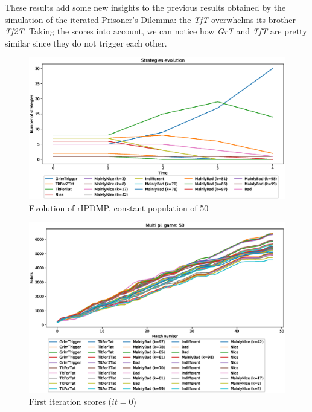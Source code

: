 \documentclass[journal,10pt,twoside]{IEEEtran}
\begin{document}
These results add some new insights to the previous results obtained by the simulation of the iterated Prisoner's Dilemma: the \textit{TfT} overwhelms its brother \textit{Tf2T}. Taking the scores into account, we can notice how \textit{GrT} and \textit{TfT} are pretty similar since they do not trigger each other.

\begin{figure}[!ht]
    \centering
    \includegraphics[width=1\columnwidth]{../img/ripdmp-const/ripdmp-evolution-const-pop-50}
    \caption{Evolution of rIPDMP, constant population of 50}
    \label{fig:constR}
\end{figure}

\begin{figure}[!ht]
    \centering
    \includegraphics[width=1\columnwidth]{../img/ripdmp-const/ripdmp-scores-const-pop-50-r0}
    \caption{First iteration scores ($it=0$)}
    \label{fig:constFI}
\end{figure}
\end{document}
